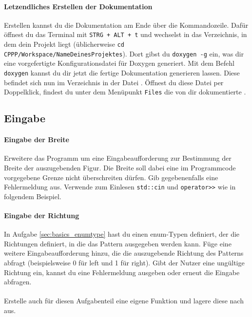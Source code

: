 

\paragraph{Letzendliches Erstellen der Dokumentation}
Erstellen kannst du die Dokumentation am Ende über die Kommandozeile.
Dafür öffnest du das Terminal mit \lstinline{STRG + ALT + t} und wechselst in das Verzeichnis, in dem dein Projekt liegt (üblicherweise \lstinline{cd CPPP/Workspace/NameDeinesProjektes}).
Dort gibst du \lstinline{doxygen -g} ein, was dir eine vorgefertigte Konfigurationsdatei für Doxygen generiert. Mit dem Befehl \lstinline{doxygen} kannst du dir jetzt die fertige Dokumentation generieren lassen.
Diese befindet sich nun im Verzeichnis  in der Datei .
Öffnest du diese Datei per Doppelklick, findest du unter dem Menüpunkt \lstinline{Files} die von dir dokumentierte .

\subsection{Eingabe}
\paragraph{Eingabe der Breite}
Erweitere das Programm um eine Eingabeaufforderung zur Bestimmung der Breite der auszugebenden Figur.
Die Breite soll dabei eine im Programmcode vorgegebene Grenze nicht überschreiten dürfen. 
Gib gegebenenfalls eine Fehlermeldung aus.
Verwende zum Einlesen \lstinline{std::cin} und \lstinline{operator>>} wie in folgendem Beispiel.

  
  
\paragraph{Eingabe der Richtung}
In Aufgabe \ref{sec:basics_enumtype} hast du einen enum-Typen definiert, der die Richtungen definiert, in die das Pattern ausgegeben werden kann. Füge eine weitere Eingabeaufforderung hinzu, die die auszugebende Richtung des Patterns abfragt (beispielsweise 0 für left und 1 für right). Gibt der Nutzer eine ungültige Richtung ein, kannst du eine Fehlermeldung ausgeben oder erneut die Eingabe abfragen.\\
\\
Erstelle auch für diesen Aufgabenteil eine eigene Funktion und lagere diese nach  aus.

